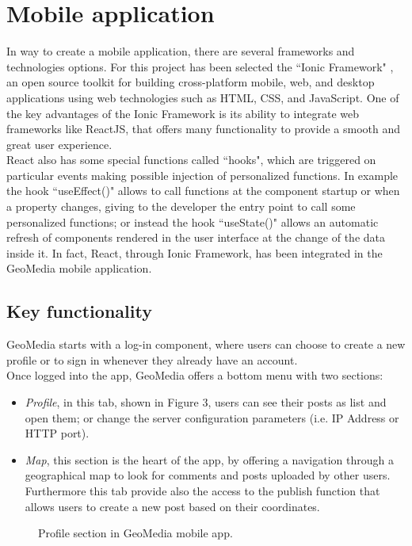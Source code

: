 \documentclass[conference]{IEEEtran}
\begin{document}
\section{Mobile application}
In way to create a mobile application, there are several frameworks and technologies options. For this project has been selected the ``Ionic Framework" \cite{b1}, an open source toolkit for building cross-platform mobile, web, and desktop applications using web technologies such as HTML, CSS, and JavaScript.
One of the key advantages of the Ionic Framework is its ability to integrate web frameworks like ReactJS, that offers many functionality to provide a smooth and great user experience.
\\
React also has some special functions called ``hooks", which are triggered on particular events making possible injection of personalized functions. In example the hook ``useEffect()" allows to call functions at the component startup or when a property changes, giving to the developer the entry point to call some personalized functions; or instead the hook ``useState()" allows an automatic refresh of components rendered in the user interface at the change of the data inside it.
In fact, React, through Ionic Framework, has been integrated in the GeoMedia mobile application.

\subsection{Key functionality }

GeoMedia starts with a log-in component, where users can choose to create a new profile or to sign in whenever they already have an account.
\\
Once logged into the app, GeoMedia offers a bottom menu with two sections: 
\begin{itemize}
    \item \textit{Profile}, in this tab, shown in Figure 3, users can see their posts as list and open them; or change the server configuration parameters (i.e. IP Address or HTTP port).
    \item  \textit{Map}, this section is the heart of the app, by offering a navigation through a geographical map to look for comments and posts uploaded by other users. Furthermore this tab provide also the access to the publish function that allows users to create a new post based on their coordinates.
\end{itemize}

\begin{figure}[htbp]
\begin{center}
\end{center}
\caption{Profile section in GeoMedia mobile app.}
\label{fig}
\end{figure}
\FloatBarrier 
\end{document}

